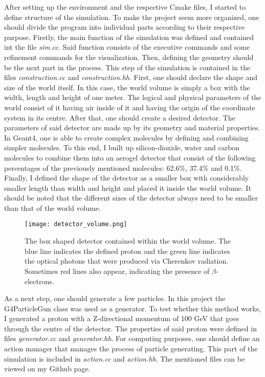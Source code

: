 \documentclass[12pt,twocolumn]{article}
\begin{document}
After setting up the environment and the respective Cmake files, I started to define structure of the simulation. To make the project seem more organized, one should divide the program into individual parts according to their respective purpose. Firstly, the main function of the simulation was defined and contained int the file \emph{sim.cc}. Said function consists of the executive commands and some refinement commands for the visualization. Then, defining the geometry should be the next part in the process. This step of the simulation is contained in the files \emph{construction.cc} and \emph{construction.hh}. First, one should declare the shape and size of the world itself. In this case, the world volume is simply a box with the width, length and height of one meter. The logical and physical parameters of the world consist of it having air inside of it and having the origin of the coordinate system in its centre. After that, one should create a desired detector. The parameters of said detector are made up by its geometry and material properties. In Geant4, one is able to create complex molecules by defining and combining simpler molecules. To this end, I built up silicon-dioxide, water and carbon molecules to combine them into an aerogel detector that consist of the following percentages of the previously mentioned molecules: 62.6\%, 37.4\% and 0.1\%. Finally, I defined the shape of the detector as a smaller box with considerably smaller length than width and height and placed it inside the world volume. It should be noted that the different sizes of the detector always need to be smaller than that of the world volume.

\begin{figure}[H]
    \centering
    \texttt{[image: detector\_volume.png]}
    \caption{The box shaped detector contained within the world volume. The blue line indicates the defined proton and the green line indicates the optical photons that were produced via Cherenkov radiation. Sometimes red lines also appear, indicating the presence of $\beta$-electrons.}
    \label{fig:basic}
\end{figure}

As a next step, one should generate a few particles. In this project the G4ParticleGun class was used as a generator. To test whether this method works, I generated a proton with a Z-directional momentum of 100 GeV that goes through the centre of the detector. The properties of said proton were defined in files \emph{generator.cc} and \emph{generator.hh}. For computing purposes, one should define an action manager that manages the process of particle generating. This part of the simulation is included in \emph{action.cc} and \emph{action.hh}. The mentioned files can be viewed on my Github page. \cite{borbende}
\end{document}
